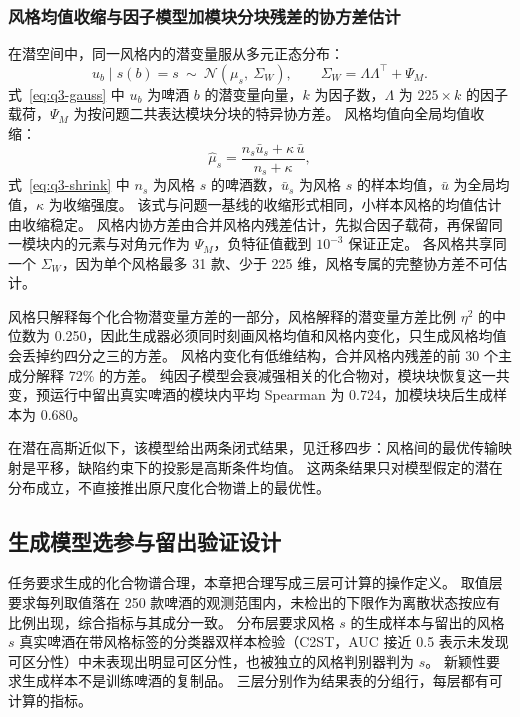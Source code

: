 \subsubsection{风格均值收缩与因子模型加模块分块残差的协方差估计}

在潜空间中，同一风格内的潜变量服从多元正态分布：
\begin{equation}\label{eq:q3-gauss}
u_b\mid s(b)=s\ \sim\ \mathcal N(\mu_s,\ \Sigma_W),\qquad \Sigma_W=\Lambda\Lambda^\top+\Psi_M .
\end{equation}
式~\eqref{eq:q3-gauss} 中 $u_b$ 为啤酒 $b$ 的潜变量向量，$k$ 为因子数，$\Lambda$ 为 $225\times k$ 的因子载荷，$\Psi_M$ 为按问题二共表达模块分块的特异协方差。
风格均值向全局均值收缩：
\begin{equation}\label{eq:q3-shrink}
\hat\mu_s=\frac{n_s\bar u_s+\kappa\,\bar u}{n_s+\kappa},
\end{equation}
式~\eqref{eq:q3-shrink} 中 $n_s$ 为风格 $s$ 的啤酒数，$\bar u_s$ 为风格 $s$ 的样本均值，$\bar u$ 为全局均值，$\kappa$ 为收缩强度。
该式与问题一基线的收缩形式相同，小样本风格的均值估计由收缩稳定。
风格内协方差由合并风格内残差估计，先拟合因子载荷，再保留同一模块内的元素与对角元作为 $\Psi_M$，负特征值截到 $10^{-3}$ 保证正定。
各风格共享同一个 $\Sigma_W$，因为单个风格最多 31 款、少于 225 维，风格专属的完整协方差不可估计。

风格只解释每个化合物潜变量方差的一部分，风格解释的潜变量方差比例 $\eta^2$ 的中位数为 0.250，因此生成器必须同时刻画风格均值和风格内变化，只生成风格均值会丢掉约四分之三的方差。
风格内变化有低维结构，合并风格内残差的前 30 个主成分解释 72\% 的方差。
纯因子模型会衰减强相关的化合物对，模块块恢复这一共变，预运行中留出真实啤酒的模块内平均 Spearman 为 0.724，加模块块后生成样本为 0.680。

在潜在高斯近似下，该模型给出两条闭式结果，见迁移四步：风格间的最优传输映射是平移，缺陷约束下的投影是高斯条件均值。
这两条结果只对模型假定的潜在分布成立，不直接推出原尺度化合物谱上的最优性。

\subsection{生成模型选参与留出验证设计}

任务要求生成的化合物谱合理，本章把合理写成三层可计算的操作定义。
取值层要求每列取值落在 250 款啤酒的观测范围内，未检出的下限作为离散状态按应有比例出现，综合指标与其成分一致。
分布层要求风格 $s$ 的生成样本与留出的风格 $s$ 真实啤酒在带风格标签的分类器双样本检验（C2ST，AUC 接近 0.5 表示未发现可区分性）中未表现出明显可区分性，也被独立的风格判别器判为 $s$。
新颖性要求生成样本不是训练啤酒的复制品。
三层分别作为结果表的分组行，每层都有可计算的指标。

